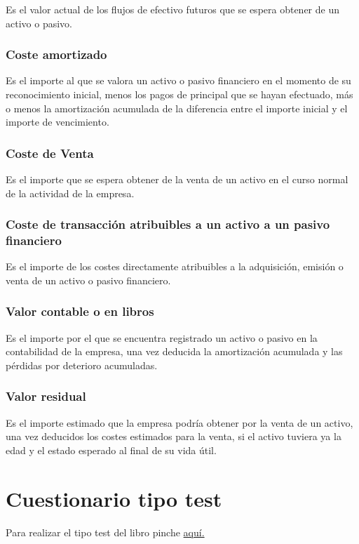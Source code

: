 \documentclass[a4paper,12pt]{article}
\begin{document}
Es el valor actual de los flujos de efectivo futuros que se espera obtener de un activo o pasivo.\\

\subsubsection{Coste amortizado}

Es el importe al que se valora un activo o pasivo financiero en el momento de su reconocimiento inicial, menos los pagos de principal que se hayan efectuado, más o menos la amortización acumulada de la diferencia entre el importe inicial y el importe de vencimiento.\\

\subsubsection{Coste de Venta}

Es el importe que se espera obtener de la venta de un activo en el curso normal de la actividad de la empresa.\\

\subsubsection{Coste de transacción atribuibles a un activo a un pasivo financiero}

Es el importe de los costes directamente atribuibles a la adquisición, emisión o venta de un activo o pasivo financiero.\\

\subsubsection{Valor contable o en libros}

Es el importe por el que se encuentra registrado un activo o pasivo en la contabilidad de la empresa, una vez deducida la amortización acumulada y las pérdidas por deterioro acumuladas.\\

\subsubsection{Valor residual}

Es el importe estimado que la empresa podría obtener por la venta de un activo, una vez deducidos los costes estimados para la venta, si el activo tuviera ya la edad y el estado esperado al final de su vida útil.\\










\newpage
\section{Cuestionario tipo test}
Para realizar el tipo test del libro pinche \href{https://elblogdeismael.github.io/Subjects/Third/CF1/Tests/testT1Libro.html}{aquí.}
\end{document}
